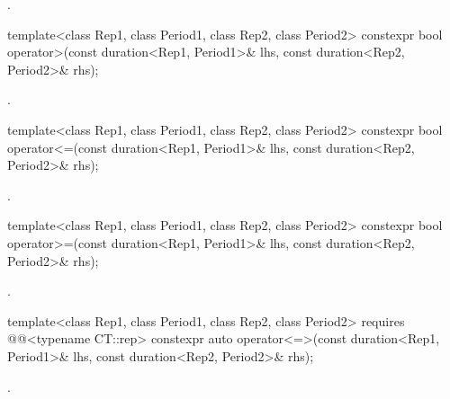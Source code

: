 \begin{itemdescr}
\pnum
\returns
{}.
\end{itemdescr}

%
\begin{itemdecl}
template<class Rep1, class Period1, class Rep2, class Period2>
  constexpr bool operator>(const duration<Rep1, Period1>& lhs,
                           const duration<Rep2, Period2>& rhs);
\end{itemdecl}

\begin{itemdescr}
\pnum
\returns
{}.
\end{itemdescr}

%
\begin{itemdecl}
template<class Rep1, class Period1, class Rep2, class Period2>
  constexpr bool operator<=(const duration<Rep1, Period1>& lhs,
                            const duration<Rep2, Period2>& rhs);
\end{itemdecl}

\begin{itemdescr}
\pnum
\returns
{}.
\end{itemdescr}

%
\begin{itemdecl}
template<class Rep1, class Period1, class Rep2, class Period2>
  constexpr bool operator>=(const duration<Rep1, Period1>& lhs,
                            const duration<Rep2, Period2>& rhs);
\end{itemdecl}

\begin{itemdescr}
\pnum
\returns
{}.
\end{itemdescr}

%
\begin{itemdecl}
template<class Rep1, class Period1, class Rep2, class Period2>
    requires @@<typename CT::rep>
  constexpr auto operator<=>(const duration<Rep1, Period1>& lhs,
                             const duration<Rep2, Period2>& rhs);
\end{itemdecl}

\begin{itemdescr}
\pnum
\returns
{}.
\end{itemdescr}

